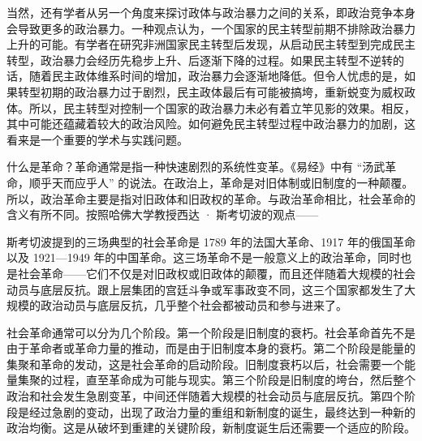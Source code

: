 当然，还有学者从另一个角度来探讨政体与政治暴力之间的关系，即政治竞争本身会导致更多的政治暴力。一种观点认为，一个国家的民主转型前期不排除政治暴力上升的可能。有学者在研究非洲国家民主转型后发现，从启动民主转型到完成民主转型，政治暴力会经历先稳步上升、后逐渐下降的过程。如果民主转型不逆转的话，随着民主政体维系时间的增加，政治暴力会逐渐地降低。但令人忧虑的是，如果转型初期的政治暴力过于剧烈，民主政体最后有可能被搞垮，重新蜕变为威权政体。所以，民主转型对控制一个国家的政治暴力未必有着立竿见影的效果。相反，其中可能还蕴藏着较大的政治风险。如何避免民主转型过程中政治暴力的加剧，这看来是一个重要的学术与实践问题。


什么是革命？革命通常是指一种快速剧烈的系统性变革。《易经》中有 “汤武革命，顺乎天而应乎人” 的说法。在政治上，革命是对旧体制或旧制度的一种颠覆。所以，政治革命主要是指对旧政体和旧政权的革命。与政治革命相比，社会革命的含义有所不同。按照哈佛大学教授西达 · 斯考切波的观点——


斯考切波提到的三场典型的社会革命是 1789 年的法国大革命、1917 年的俄国革命以及 1921—1949 年的中国革命。这三场革命不是一般意义上的政治革命，同时也是社会革命——它们不仅是对旧政权或旧政体的颠覆，而且还伴随着大规模的社会动员与底层反抗。跟上层集团的宫廷斗争或军事政变不同，这三个国家都发生了大规模的政治动员与底层反抗，几乎整个社会都被动员和参与进来了。

社会革命通常可以分为几个阶段。第一个阶段是旧制度的衰朽。社会革命首先不是由于革命者或革命力量的推动，而是由于旧制度本身的衰朽。第二个阶段是能量的集聚和革命的发动，这是社会革命的启动阶段。旧制度衰朽以后，社会需要一个能量集聚的过程，直至革命成为可能与现实。第三个阶段是旧制度的垮台，然后整个政治和社会发生急剧变革，中间还伴随着大规模的社会动员与底层反抗。第四个阶段是经过急剧的变动，出现了政治力量的重组和新制度的诞生，最终达到一种新的政治均衡。这是从破坏到重建的关键阶段，新制度诞生后还需要一个适应的阶段。

